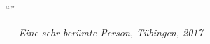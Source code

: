 \thispagestyle{plain}
\vspace*{3cm}
\begin{otherlanguage}{ngerman} %
\begin{adjustwidth*}{26pt}{26pt}
\enquote{\lipsum[1-2]} 

--- \textit{Eine sehr berümte Person, Tübingen, 2017}
\end{adjustwidth*}
\end{otherlanguage}

